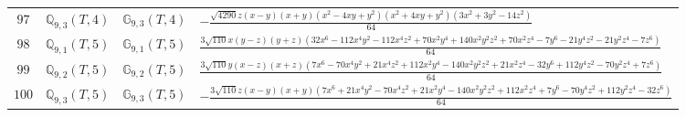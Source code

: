 \documentclass[fleqn,8pt,landscape]{jsarticle}
\begin{document}
\begin{table}[ht!]
\begin{center}
\begin{tabular}{cccl}
$ 97 $ & $ \mathbb{Q}_{9,3}(T,4) $ & $ \mathbb{G}_{9,3}(T,4) $ & $ - \frac{\sqrt{4290} z \left(x - y\right) \left(x + y\right) \left(x^{2} - 4 x y + y^{2}\right) \left(x^{2} + 4 x y + y^{2}\right) \left(3 x^{2} + 3 y^{2} - 14 z^{2}\right)}{64} $ \\
$ 98 $ & $ \mathbb{Q}_{9,1}(T,5) $ & $ \mathbb{G}_{9,1}(T,5) $ & $ \frac{3 \sqrt{110} x \left(y - z\right) \left(y + z\right) \left(32 x^{6} - 112 x^{4} y^{2} - 112 x^{4} z^{2} + 70 x^{2} y^{4} + 140 x^{2} y^{2} z^{2} + 70 x^{2} z^{4} - 7 y^{6} - 21 y^{4} z^{2} - 21 y^{2} z^{4} - 7 z^{6}\right)}{64} $ \\
$ 99 $ & $ \mathbb{Q}_{9,2}(T,5) $ & $ \mathbb{G}_{9,2}(T,5) $ & $ \frac{3 \sqrt{110} y \left(x - z\right) \left(x + z\right) \left(7 x^{6} - 70 x^{4} y^{2} + 21 x^{4} z^{2} + 112 x^{2} y^{4} - 140 x^{2} y^{2} z^{2} + 21 x^{2} z^{4} - 32 y^{6} + 112 y^{4} z^{2} - 70 y^{2} z^{4} + 7 z^{6}\right)}{64} $ \\
$ 100 $ & $ \mathbb{Q}_{9,3}(T,5) $ & $ \mathbb{G}_{9,3}(T,5) $ & $ - \frac{3 \sqrt{110} z \left(x - y\right) \left(x + y\right) \left(7 x^{6} + 21 x^{4} y^{2} - 70 x^{4} z^{2} + 21 x^{2} y^{4} - 140 x^{2} y^{2} z^{2} + 112 x^{2} z^{4} + 7 y^{6} - 70 y^{4} z^{2} + 112 y^{2} z^{4} - 32 z^{6}\right)}{64} $ \\
 \hline \hline
\end{tabular}
\end{center}
\end{table}
\end{document}
